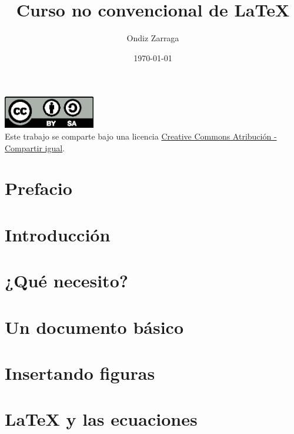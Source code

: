 \documentclass[a4paper,10pt]{book}
\title{Curso no convencional de \LaTeX}
\author{Ondiz Zarraga}
\date{\today}
\begin{document}
\frontmatter
\maketitle

\newpage %
 
\null %
\vfill %
 
\includegraphics[width=0.3\textwidth]{docs/Figuras/by-sa}\\
Este trabajo se comparte bajo una licencia
\href{https://creativecommons.org/licenses/by-sa/4.0/}
{Creative Commons Atribución - Compartir igual}.


\thispagestyle{empty}

\tableofcontents


\chapter*{Prefacio}


\mainmatter

\chapter{Introducción}


\chapter{¿Qué necesito?}


\chapter{Un documento básico}


\chapter{Insertando figuras}


\chapter{LaTeX y las ecuaciones}

\end{document}

